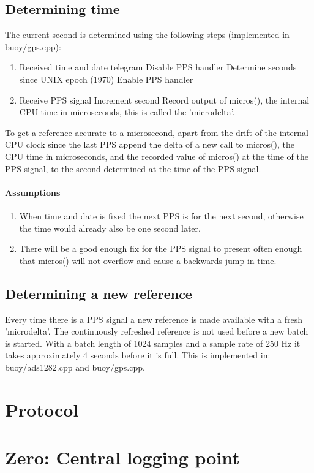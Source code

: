 \documentclass[a4paper]{article}
\begin{document}
\begin{multicols}{2}
  \subsection{Determining time}
  The current second is determined using the following steps
  (implemented in buoy/gps.cpp):

  \begin{enumerate}
    \item Received time and date telegram
      \subitem Disable PPS handler
      \subitem Determine seconds since UNIX epoch (1970)
      \subitem Enable PPS handler
    \item Receive PPS signal
      \subitem Increment second
      \subitem Record output of micros(), the internal CPU time in
      microseconds, this is called the 'microdelta'.
  \end{enumerate}

  To get a reference accurate to a microsecond, apart from the drift
  of the internal CPU clock since the last PPS append the delta of a new
  call to micros(), the CPU time in microseconds, and the recorded value
  of micros() at the time of the PPS signal, to the second determined at
  the time of the PPS signal.

  \paragraph{Assumptions}
  \begin{enumerate}
    \item When time and date is fixed the next PPS is for the next
      second, otherwise the time would already also be one second
      later.
    \item There will be a good enough fix for the PPS signal to present
      often enough that micros() will not overflow and cause a backwards
      jump in time.
  \end{enumerate}

  \subsection{Determining a new reference}
  Every time there is a PPS signal a
  new reference is made available with a fresh 'microdelta'. The
  continuously refreshed reference is not used before a new batch is
  started. With a batch length of 1024 samples and a sample rate of 250
  Hz it takes approximately 4 seconds before it is full. This is
  implemented in: buoy/ads1282.cpp and buoy/gps.cpp.


  \section{Protocol}

  \section{Zero: Central logging point}


\vspace{5em}
\printbibliography
\end{multicols}
\end{document}
